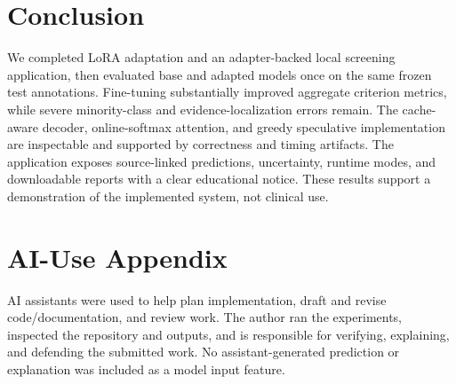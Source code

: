 ﻿\documentclass[conference]{IEEEtran}
\begin{document}
\section{Conclusion}
We completed LoRA adaptation and an adapter-backed local screening application, then evaluated base and adapted models once on the same frozen test annotations. Fine-tuning substantially improved aggregate criterion metrics, while severe minority-class and evidence-localization errors remain. The cache-aware decoder, online-softmax attention, and greedy speculative implementation are inspectable and supported by correctness and timing artifacts. The application exposes source-linked predictions, uncertainty, runtime modes, and downloadable reports with a clear educational notice. These results support a demonstration of the implemented system, not clinical use.

\section*{AI-Use Appendix}
AI assistants were used to help plan implementation, draft and revise code/documentation, and review work. The author ran the experiments, inspected the repository and outputs, and is responsible for verifying, explaining, and defending the submitted work. No assistant-generated prediction or explanation was included as a model input feature.



\end{document}

